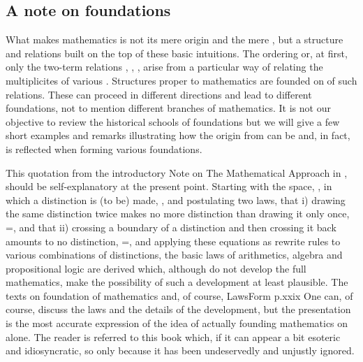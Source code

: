 \subsection{A note on foundations}\label{sub:foundations} 
What makes mathematics is not its mere origin and the mere ,
but a structure and relations built on the top of these basic intuitions.
The ordering or, at first, only the two-term relations ,
, , arise from a particular way of relating the
multiplicites of various .  Structures proper to mathematics are
founded on  of such relations.  These
 can proceed in different directions and lead to different
foundations, not to mention different branches of mathematics.  It is not our
objective to review the historical schools of foundations but we will give a few
short examples and remarks illustrating how the origin from  can be
and, in fact, is reflected when forming various foundations.

\pa {} This quotation from the
introductory Note on The Mathematical Approach in \citeauthor*{LawsForm}, should
be self-explanatory at the present point. Starting with the space, \esp, in
which a distinction is (to be) made, \setlength{\unitlength}{.1cm}\dist, and postulating two laws, that i)
drawing the same distinction twice makes no more distinction than drawing it
only once, \dist\dist=\dist, and that ii) crossing a boundary of a distinction
and then crossing it back amounts to no distinction, \twice=\esp, and applying
these equations as rewrite rules to various combinations of distinctions, the
basic laws of arithmetics, algebra and propositional logic are derived which,
although do not develop the full mathematics, make the possibility of such a
development at least plausible. The texts on foundation of mathematics and, of
course, \citet{mathematical texts generally begin the story somewhere in the
  middle, leaving the reader to pick up the thread as best he can. Here the
  story is traced from the beginning.}{LawsForm}{ p.xxix} One can, of course,
discuss the laws and the details of the development, but the presentation is the
most accurate expression of the idea of actually founding mathematics on
 alone. The reader is referred to this book which, if it
can appear a bit esoteric and idiosyncratic, so only because it has been
undeservedly and unjustly ignored.

